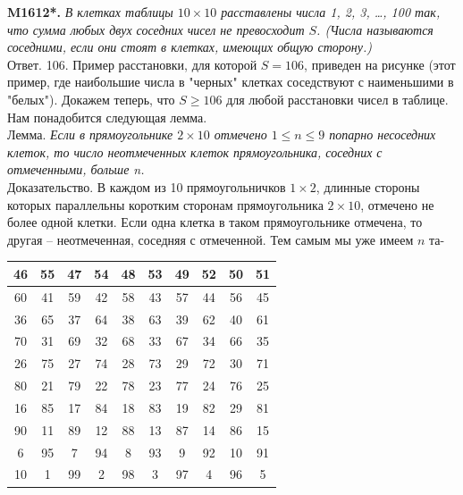 \begin{multicols}{2}
\textsf{\textbf{M1612*.}} 
\textit{В клетках таблицы $10\times10$ расставлены числа 1, 2, 3, \dots, 100 так, что сумма любых двух соседних чисел не превосходит $S$. (Числа называются соседними, если они стоят в клетках, имеющих общую сторону.)}\\\textsf{Ответ.} 106. Пример расстановки, для которой $S = 106$, приведен на рисунке (этот пример, где наибольшие числа в "черных" клетках соседствуют с наименьшими в "белых"). Докажем теперь, что $S \geq 106$ для любой расстановки чисел в таблице. Нам понадобится следующая лемма.\\\textsf{Лемма.} \textit{Если в прямоугольнике $2\times10$ отмечено $1 \leq n \leq 9$ попарно несоседних клеток, то число неотмеченных клеток прямоугольника, соседних с отмеченными, больше n.}\\\textsf{Доказательство.} В каждом из 10 прямоугольничков $1\times2$, длинные стороны которых параллельны коротким сторонам прямоугольника $2\times10$, отмечено не более одной клетки. Если одна клетка в таком прямоугольнике отмечена, то другая -- неотмеченная, соседняя с отмеченной. Тем самым мы уже имеем $n$ та-
\begin{center}
\begin{tabular}{ |c|c|c|c|c|c|c|c|c|c| } 
 \hline
 46 & 55 & 47 & 54 & 48 & 53 & 49 & 52 & 50 & 51 \\ \hline
 60 & 41 & 59 & 42 & 58 & 43 & 57 & 44 & 56 & 45 \\ \hline
 36 & 65 & 37 & 64 & 38 & 63 & 39 & 62 & 40 & 61 \\ \hline
 70 & 31 & 69 & 32 & 68 & 33 & 67 & 34 & 66 & 35 \\ \hline
 26 & 75 & 27 & 74 & 28 & 73 & 29 & 72 & 30 & 71 \\ \hline
 80 & 21 & 79 & 22 & 78 & 23 & 77 & 24 & 76 & 25 \\ \hline
 16 & 85 & 17 & 84 & 18 & 83 & 19 & 82 & 29 & 81 \\ \hline
 90 & 11 & 89 & 12 & 88 & 13 & 87 & 14 & 86 & 15 \\ \hline
 6 & 95 & 7 & 94 & 8 & 93 & 9 & 92 & 10 & 91 \\ \hline
 10 & 1 & 99 & 2 & 98 & 3 & 97 & 4 & 96 & 5 \\ \hline
\end{tabular}
\end{center}

\end{multicols}
